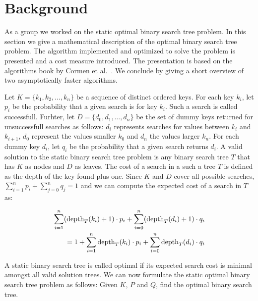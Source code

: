 \section{Background}

As a group we worked on the static optimal binary search tree problem.
In this section we give a mathematical description of the optimal binary
search tree problem. The algorithm implemented and optimized to solve the
problem is presented and a cost measure introduced. The presentation is
based on the algorithms book by Cormen et al.~\cite{MITBook}. We conclude
by giving a short overview of two asymptotically faster algorithms.

 Let $K = \{k_1, k_2, \dots, k_n\}$ be a sequence
of distinct ordered keys. For each key $k_i$, let $p_i$ be the probability
that a given search is for key $k_i$. Such a search is called successfull.
Furhter, let $D = \{d_0, d_1, \dots, d_n\}$ be the set of dummy keys
returned for unsuccessfull searches as follows: $d_i$ represents searches
for values between $k_i$ and $k_{i+1}$, $d_0$ represent the values smaller
$k_0$ and $d_n$ the values larger $k_n$. For each dummy key $d_i$, let
$q_i$ be the probability that a given search returns $d_i$.
A valid solution to the static binary search tree problem is any binary
search tree $T$ that has $K$ as nodes and $D$ as leaves.
The cost of a search in a such a tree $T$ is defined as the depth of the key
found plus one. Since $K$ and $D$ cover all possible searches,
$\sum_{i=1}^n p_i + \sum_{j=0}^n q_j = 1$ and we can compute the expected
cost of a search in $T$ as:

\begin{align}
  \sum_{i=1}^n (\operatorname{depth}_T(k_i) + 1) \cdot p_i
   + \sum_{i=0}^n (\operatorname{depth}_T(d_i) + 1) \cdot q_i
  \nonumber\\
  = 1 + \sum_{i=1}^n \operatorname{depth}_T(k_i) \cdot p_i
      + \sum_{i=0}^n \operatorname{depth}_T(d_i) \cdot q_i
  \label{eqn:cost}
\end{align}

A static binary search tree is called optimal if its expected search cost
is minimal amongst all valid solution trees.
We can now formulate the static optimal binary search tree problem as
follows: Given $K$, $P$ and $Q$, find the optimal binary search tree.


